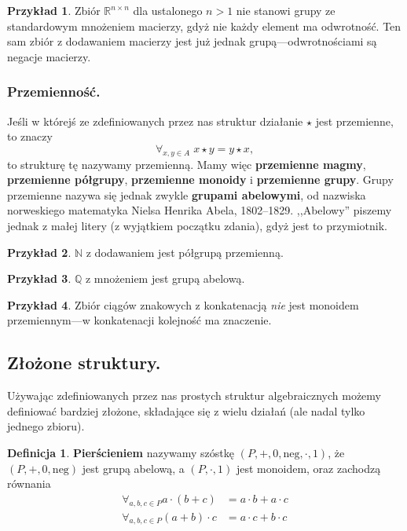 \documentclass{article}
\theoremstyle{definition}
\newtheorem{definition}{Definicja}[section]
\newtheorem{example}{Przykład}[section]
\begin{document}
\begin{example}
	Zbiór $\mathbb{R}^{n \times n}$ dla ustalonego $n > 1$ nie stanowi grupy
		ze standardowym mnożeniem macierzy,
		gdyż nie każdy element ma odwrotność.
	Ten sam zbiór z dodawaniem macierzy jest już jednak grupą---odwrotnościami są negacje macierzy.
\end{example}

\subsubsection{Przemienność.}
Jeśli w którejś ze zdefiniowanych przez nas struktur działanie $\star$ jest przemienne, to znaczy
\begin{equation}
	\forall_{x,y \in A}\; x \star y = y \star x,
\end{equation}
to strukturę tę nazywamy przemienną.
Mamy więc \textbf{przemienne magmy}, \textbf{przemienne półgrupy}, \textbf{przemienne monoidy} i \textbf{przemienne grupy}.
Grupy przemienne nazywa się jednak zwykle \textbf{grupami abelowymi},
od nazwiska norweskiego matematyka Nielsa Henrika Abela, 1802--1829.
,,Abelowy'' piszemy jednak z małej litery (z wyjątkiem początku zdania), gdyż jest to przymiotnik.

\begin{example}
	$\mathbb{N}$ z dodawaniem jest półgrupą przemienną.
\end{example}

\begin{example}
	$\mathbb{Q}$ z mnożeniem jest grupą abelową.
\end{example}

\begin{example}
	Zbiór ciągów znakowych z konkatenacją \textit{nie} jest monoidem przemiennym---w konkatenacji kolejność ma znaczenie.
\end{example}

\subsection{Złożone struktury.}
Używając zdefiniowanych przez nas prostych struktur algebraicznych możemy definiować bardziej złożone,
	składające się z wielu działań (ale nadal tylko jednego zbioru).

\begin{definition}
	\textbf{Pierścieniem} nazywamy szóstkę $(P, +, 0, \mathrm{neg}, \cdot, 1)$,
		że $(P, +, 0, \mathrm{neg})$ jest grupą abelową,
		a $(P, \cdot, 1)$ jest monoidem,
		oraz zachodzą równania
		\begin{align}
			\label{dist1}\forall_{a, b, c \in P} a \cdot (b + c) &= a \cdot b + a \cdot c \\
			\label{dist2}\forall_{a, b, c \in P} (a + b) \cdot c &= a \cdot c + b \cdot c
		\end{align}
\end{definition}
\end{document}
